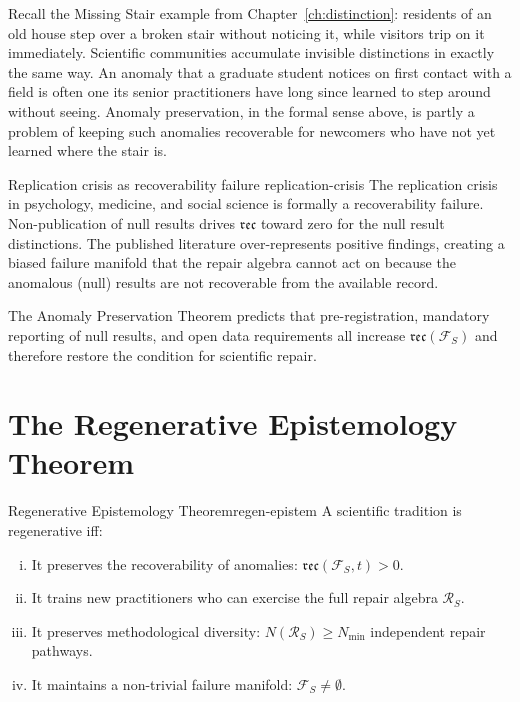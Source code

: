 \documentclass[12pt,twoside,openright]{book}
\newcommand{\reco}{\mathfrak{rec}}
\newcounter{exercise}[chapter]
\begin{document}
Recall the Missing Stair example from
Chapter~\ref{ch:distinction}: residents of an old house step
over a broken stair without noticing it, while visitors trip
on it immediately. Scientific communities accumulate
invisible distinctions in exactly the same way. An anomaly
that a graduate student notices on first contact with a field
is often one its senior practitioners have long since learned
to step around without seeing. Anomaly preservation, in the
formal sense above, is partly a problem of keeping such
anomalies recoverable for newcomers who have not yet learned
where the stair is.

\begin{remark}{Replication crisis as recoverability failure}%
  {replication-crisis}
  The replication crisis in psychology, medicine, and
  social science is formally a recoverability failure.
  Non-publication of null results drives $\reco$
  toward zero for the null result distinctions. The
  published literature over-represents positive
  findings, creating a biased failure manifold that
  the repair algebra cannot act on because the
  anomalous (null) results are not recoverable from
  the available record.

  The Anomaly Preservation Theorem predicts that
  pre-registration, mandatory reporting of null results,
  and open data requirements all increase
  $\reco(\mathcal{F}_S)$ and therefore restore the
  condition for scientific repair.
\end{remark}

\section{The Regenerative Epistemology Theorem}

\begin{theorem}{Regenerative Epistemology Theorem}{regen-epistem}
  A scientific tradition is regenerative iff:
  \begin{enumerate}[(i)]
    \item It preserves the recoverability of anomalies:
          $\reco(\mathcal{F}_S, t) > 0$.
    \item It trains new practitioners who can exercise
          the full repair algebra $\mathcal{R}_S$.
    \item It preserves methodological diversity:
          $N(\mathcal{R}_S) \ge N_{\min}$ independent
          repair pathways.
    \item It maintains a non-trivial failure manifold:
          $\mathcal{F}_S \ne \emptyset$.
  \end{enumerate}
\end{theorem}
\end{document}
